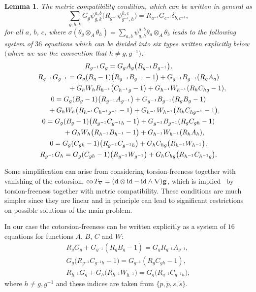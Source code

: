 \documentclass[10pt,a4paper]{amsart}
\numberwithin{equation}{section}
\newtheorem{Lemma}[Theorem]{Lemma}
\newcommand{\ip}{{\tilde{p}}}
\newcommand{\is}{{\tilde{s}}}
\begin{document}
\begin{Lemma}The metric compatibility condition, which can be written in general as
\begin{equation*}
\sum\limits_{g,h,k}G_g \psi^{a,b}_{g,k}\big(R_{g^{-1}}\psi^{k,c}_{g^{-1},h}\big)=R_{a^{-1}}G_{c^{-1}}\delta_{b,c^{-1}},
\end{equation*}
for all $a$, $b$, $c$, where $\sigma(\theta_g\otimes_A\theta_h)=\sum\limits_{a,b}\psi_{g,h}^{a,b}\theta_a\otimes_A \theta_b$ leads
to the following system of $36$ equations which can be divided into six types written
explicitly below $($where we use the convention that $h\neq g,g^{-1})$:
\begin{gather*}
 R_{g^{-1}}G_g=G_gA_g\big(R_{g^{-1}}B_{g^{-1}}\big),\\
R_{g^{-1}}G_{g^{-1}}=G_g(B_g-1)\big(R_{g^{-1}}B_{g^{-1}}-1\big)+G_{g^{-1}}B_{g^{-1}}(R_gA_g) \\
\hphantom{R_{g^{-1}}G_{g^{-1}}=}{}
+G_hW_hR_{h^{-1}}\big(C_{h^{-1}g}-1\big)+G_{h^{-1}}W_{h^{-1}}(R_hC_{hg}-1),\\
 0=G_g(B_g-1)\big(R_{g^{-1}}A_{g^{-1}}\big)+G_{g^{-1}}B_{g^{-1}}(R_gB_g-1)\\
\hphantom{0=}{} +G_hW_h\big(R_{h^{-1}}C_{h^{-1}g^{-1}}-1\big)+G_{h^{-1}}W_{h^{-1}}\big(R_hC_{hg^{-1}}-1\big),\\
 0=G_g(B_g-1)\big(R_{g^{-1}}C_{g^{-1}h}-1\big)+G_{g^{-1}}B_{g^{-1}}(R_gC_{gh}-1) \\
\hphantom{0=}{} +G_hW_h\big(R_{h^{-1}}B_{h^{-1}}-1\big)+G_{h^{-1}}W_{h^{-1}}(R_hA_h),\\
0=G_g(C_{gh}-1)\big(R_{g^{-1}}C_{g^{-1}h}\big)+G_hC_{hg}\big(R_{h^{-1}}W_{h^{-1}}\big),\\
R_{g^{-1}}G_h=G_g(C_{gh}-1)\big(R_{g^{-1}}W_{g^{-1}}\big)+G_hC_{hg}\big(R_{h^{-1}}C_{h^{-1}g}\big).
\end{gather*}
\end{Lemma}

Some simplification can arise from considering torsion-freeness together with vanishing of the cotorsion, $\operatorname{co}T_\nabla=({\rm d}\otimes\mathrm{id}-\mathrm{id}\wedge \nabla){\bf g}$,
which is implied~\cite{TM20} by torsion-freeness together with metric compatibility. These
conditions are much simpler since they are linear and in principle can lead to significant restrictions on possible solutions of the main problem.

In our case the cotorsion-freeness can be written explicitly as a system of $16$ equations for functions $A$, $B$, $C$ and $W$:
\begin{gather*}
R_gG_g+G_{g^{-1}}(R_gB_g-1)=G_gR_{g^{-1}}A_{g^{-1}},\\
G_g\big(R_{g^{-1}}C_{g^{-1}h}-1\big)=G_{g^{-1}}(R_gC_{gh}-1),\\
R_{h^{-1}}G_g+G_h\big(R_{h^{-1}}W_{h^{-1}}\big)=G_g\big(R_{g^{-1}}C_{g^{-1}h}\big),
\end{gather*}
where $h\neq g,g^{-1}$ and these indices are taken from $\{p,\ip,s,\is\}$.
\end{document}
